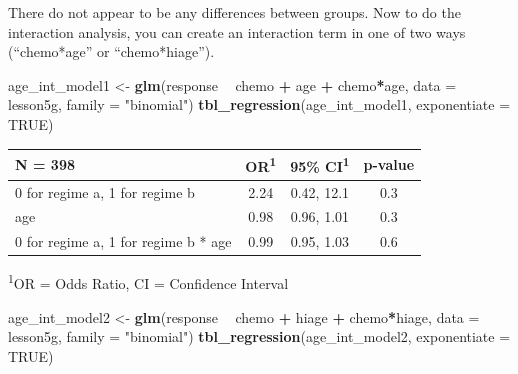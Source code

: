 \documentclass[]{book}
\newenvironment{Shaded}{\begin{snugshade}}{\end{snugshade}}
\newcommand{\DataTypeTok}[1]{\textcolor[rgb]{0.13,0.29,0.53}{#1}}
\newcommand{\KeywordTok}[1]{\textcolor[rgb]{0.13,0.29,0.53}{\textbf{#1}}}
\newcommand{\NormalTok}[1]{#1}
\newcommand{\OperatorTok}[1]{\textcolor[rgb]{0.81,0.36,0.00}{\textbf{#1}}}
\newcommand{\OtherTok}[1]{\textcolor[rgb]{0.56,0.35,0.01}{#1}}
\newcommand{\StringTok}[1]{\textcolor[rgb]{0.31,0.60,0.02}{#1}}
\begin{document}
There do not appear to be any differences between groups. Now to do the
interaction analysis, you can create an interaction term in one of two
ways (``chemo*age'' or ``chemo*hiage'').

\begin{Shaded}
\begin{Highlighting}[]
\NormalTok{age_int_model1 <-}
\StringTok{  }\KeywordTok{glm}\NormalTok{(response }\OperatorTok{~}\StringTok{ }\NormalTok{chemo }\OperatorTok{+}\StringTok{ }\NormalTok{age }\OperatorTok{+}\StringTok{ }\NormalTok{chemo}\OperatorTok{*}\NormalTok{age,}
      \DataTypeTok{data =}\NormalTok{ lesson5g,}
      \DataTypeTok{family =} \StringTok{"binomial"}\NormalTok{)}
\KeywordTok{tbl_regression}\NormalTok{(age_int_model1, }\DataTypeTok{exponentiate =} \OtherTok{TRUE}\NormalTok{)}
\end{Highlighting}
\end{Shaded}

\captionsetup[table]{labelformat=empty,skip=1pt}
\begin{longtable}{lccc}
\toprule
\textbf{N = 398} & \textbf{OR}\textsuperscript{1} & \textbf{95\% CI}\textsuperscript{1} & \textbf{p-value} \\ 
\midrule
0 for regime a, 1 for regime b & 2.24 & 0.42, 12.1 & 0.3 \\ 
age & 0.98 & 0.96, 1.01 & 0.3 \\ 
0 for regime a, 1 for regime b * age & 0.99 & 0.95, 1.03 & 0.6 \\ 
\bottomrule
\end{longtable}
\vspace{-5mm}
\begin{minipage}{\linewidth}
\textsuperscript{1}OR = Odds Ratio, CI = Confidence Interval \\ 
\end{minipage}

\begin{Shaded}
\begin{Highlighting}[]
\NormalTok{age_int_model2 <-}
\StringTok{  }\KeywordTok{glm}\NormalTok{(response }\OperatorTok{~}\StringTok{ }\NormalTok{chemo }\OperatorTok{+}\StringTok{ }\NormalTok{hiage }\OperatorTok{+}\StringTok{ }\NormalTok{chemo}\OperatorTok{*}\NormalTok{hiage,}
      \DataTypeTok{data =}\NormalTok{ lesson5g,}
      \DataTypeTok{family =} \StringTok{"binomial"}\NormalTok{)}
\KeywordTok{tbl_regression}\NormalTok{(age_int_model2, }\DataTypeTok{exponentiate =} \OtherTok{TRUE}\NormalTok{)}
\end{Highlighting}
\end{Shaded}
\end{document}
